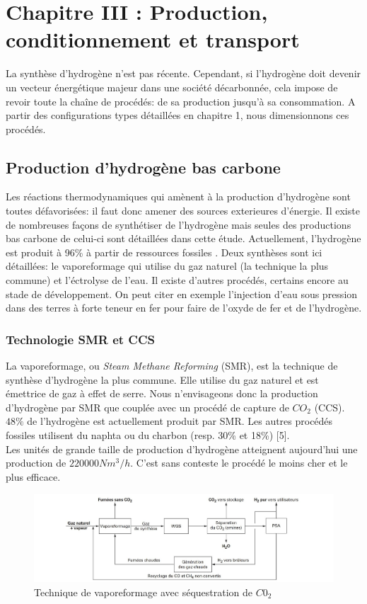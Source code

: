 \documentclass[11pt,french,a4paper]{article}
\begin{document}
\section{Chapitre III : Production, conditionnement et transport}
La synthèse d'hydrogène n'est pas récente. Cependant, si l'hydrogène doit devenir un vecteur énergétique majeur dans une société décarbonnée, cela impose de revoir toute la chaîne de procédés: de sa production jusqu'à sa consommation. A partir des configurations types détaillées en chapitre 1, nous dimensionnons ces procédés.
\subsection{Production d'hydrogène bas carbone}
Les réactions thermodynamiques qui amènent à la production d'hydrogène sont toutes défavorisées: il faut donc amener des sources exterieures d'énergie. Il existe de nombreuses façons de synthétiser de l'hydrogène mais seules des productions bas carbone de celui-ci sont détaillées dans cette étude.  Actuellement, l'hydrogène est  produit à 96\% à partir de ressources fossiles \cite{Surla2019}. Deux synthèses sont ici détaillées: le vaporeformage qui utilise du gaz naturel (la technique la plus commune) et l'éctrolyse de l'eau. Il existe d'autres procédés, certains encore au stade de développement. On peut citer en exemple l'injection d'eau sous pression dans des terres à forte teneur en fer pour faire de l'oxyde de fer et de l'hydrogène.

\subsubsection{Technologie SMR et CCS}
La vaporeformage, ou \emph{Steam Methane Reforming} (SMR), est la technique de synthèse d'hydrogène la plus commune. Elle utilise du gaz naturel et est émettrice de gaz à effet de serre. Nous n'envisageons donc la production d'hydrogène par SMR que couplée  avec un procédé de capture de $CO_2$ (CCS). $48 \% $ de l'hydrogène est actuellement produit par SMR. Les autres procédés fossiles utilisent du naphta ou du charbon (resp. 30\% et 18\%) [5]. \\  
Les unités de grande taille de production d'hydrogène atteignent aujourd’hui une production de $220000 Nm^3/h$. C'est sans conteste le procédé le moins cher et le plus efficace.

\begin{center}
\begin{figure}[!h]
\includegraphics[width=0.95\linewidth]{image/chap3/Vapo_avec_sequestration.jpg}
\caption{Technique de vaporeformage avec séquestration de $C0_2$ \cite{Prod_gaz_synth}}
\end{figure}
\end{center}
\end{document}
